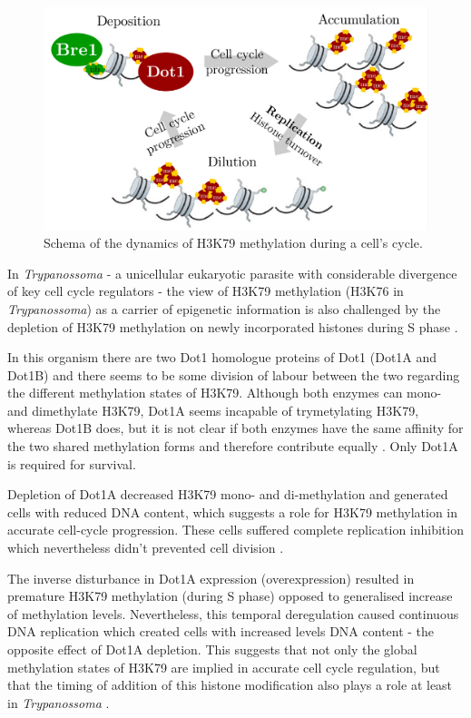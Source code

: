 \documentclass[11pt,twoside,a4paper]{report}
\begin{document}
		\begin{figure}[here]
			\centering
			\includegraphics[width=0.9\linewidth]{pngs/dot1_k79.png}
			\caption{Schema of the dynamics of H3K79 methylation during a cell's cycle.}
			\label{fig:dot1_k79}
		\end{figure}
		
		In \textit{Trypanossoma} - a unicellular eukaryotic parasite with considerable divergence of key cell cycle regulators - the view of H3K79 methylation (H3K76 in \textit{Trypanossoma}) as a carrier of epigenetic information is also challenged by the depletion of H3K79 methylation on newly incorporated histones during S phase \cite{Gassen2012}.
		
		In this organism there are two Dot1 homologue proteins of Dot1 (Dot1A and Dot1B) and there seems to be some division of labour between the two regarding the different methylation states of H3K79. Although both enzymes can mono- and dimethylate H3K79, Dot1A seems incapable of trymetylating H3K79, whereas Dot1B does, but it is not clear if both enzymes have the same affinity for the two shared methylation forms and therefore contribute equally \cite{Gassen2012}. Only Dot1A is required for survival.
	
		Depletion of Dot1A decreased H3K79 mono- and di-methylation and generated cells with reduced DNA content, which suggests a role for H3K79 methylation in accurate cell-cycle progression. These cells suffered complete replication inhibition which nevertheless didn't prevented cell division \cite{Gassen2012}.
		
		The inverse disturbance in Dot1A expression (overexpression) resulted in premature H3K79 methylation (during S phase) opposed to generalised increase of methylation levels. Nevertheless, this temporal deregulation caused continuous DNA replication which created cells with increased levels DNA content - the opposite effect of Dot1A depletion. This suggests that not only the global methylation states of H3K79 are implied in accurate cell cycle regulation, but that the timing of addition of this histone modification also plays a role at least in \textit{Trypanossoma} \cite{Gassen2012}.
		
\end{document}

